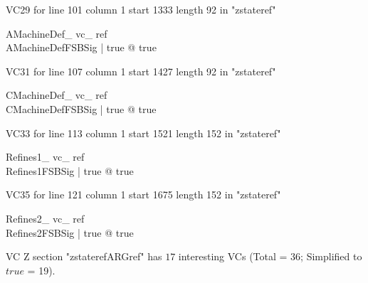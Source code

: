 \documentclass{article}
\begin{document}
VC29 for line 101 column 1 start 1333 length 92 in "zstateref"
\begin{theorem}{ AMachineDef\_ vc\_ ref}\\
 \exists AMachineDefFSBSig | true @ true \\

\end{theorem}

VC31 for line 107 column 1 start 1427 length 92 in "zstateref"
\begin{theorem}{ CMachineDef\_ vc\_ ref}\\
 \exists CMachineDefFSBSig | true @ true \\

\end{theorem}

VC33 for line 113 column 1 start 1521 length 152 in "zstateref"
\begin{theorem}{ Refines1\_ vc\_ ref}\\
 \exists Refines1FSBSig | true @ true \\

\end{theorem}

VC35 for line 121 column 1 start 1675 length 152 in "zstateref"
\begin{theorem}{ Refines2\_ vc\_ ref}\\
 \exists Refines2FSBSig | true @ true \\

\end{theorem}



 VC Z section "zstaterefARGref" has $17$ interesting VCs (Total = 36; Simplified to $true$ = 19).



\end{document}
